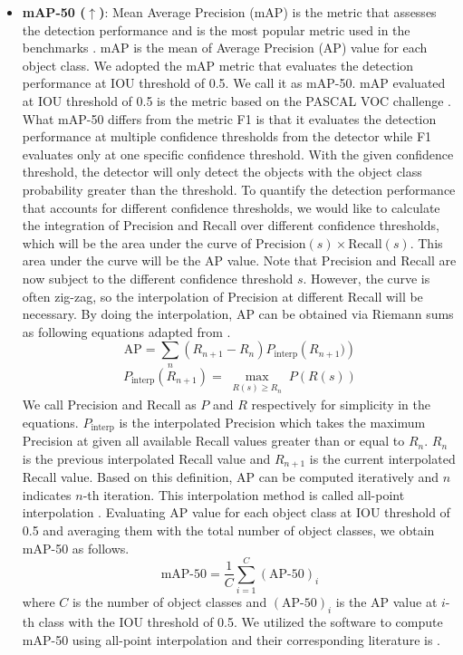 \begin{itemize}
\item \textbf{mAP-50 ($\uparrow$)}: Mean Average Precision (mAP) is the metric that assesses the detection performance and is the most popular metric used in the benchmarks \cite{padilla_comparative_2021}. mAP is the mean of Average Precision (AP) value for each object class. We adopted the mAP metric that evaluates the detection performance at IOU threshold of 0.5. We call it as mAP-50. mAP evaluated at IOU threshold of 0.5 is the metric based on the PASCAL VOC challenge \cite{everingham_pascal_2015}. What mAP-50 differs from the metric F1 is that it evaluates the detection performance at multiple confidence thresholds from the detector while F1 evaluates only at one specific confidence threshold. With the given confidence threshold, the detector will only detect the objects with the object class probability greater than the threshold. To quantify the detection performance that accounts for different confidence thresholds, we would like to calculate the integration of Precision and Recall over different confidence thresholds, which will be the area under the curve of $\text{Precision}(s) \times \text{Recall}(s)$. This area under the curve will be the AP value. Note that Precision and Recall are now subject to the different confidence threshold $s$. However, the curve is often zig-zag, so the interpolation of Precision at different Recall will be necessary. By doing the interpolation, AP can be obtained via Riemann sums as following equations adapted from \cite{padilla_survey_2020} \cite{padilla_comparative_2021}. 
\begin{equation}
\text{AP} = \sum_{n} \left( R_{n+1} - R_{n} \right) P_{\text{interp}} \left( R_{n+1}) \right)
\label{eqn:AP}
\end{equation}
\begin{equation}
P_{\text{interp}} \left( R_{n+1} \right) = \max_{\substack{R \left(s \right) \geq R_{n}}} P \left( R \left(s \right) \right)
\end{equation}
\label{eqn:P_interp}
We call Precision and Recall as $P$ and $R$ respectively for simplicity in the equations. $P_{\text{interp}}$ is the interpolated Precision which takes the maximum Precision at given all available Recall values greater than or equal to $R_{n}$. $R_{n}$ is the previous interpolated Recall value and $R_{n+1}$ is the current interpolated Recall value. Based on this definition, AP can be computed iteratively and $n$ indicates $n$-th iteration. This interpolation method is called all-point interpolation \cite{padilla_survey_2020}. Evaluating AP value for each object class at IOU threshold of 0.5 and averaging them with the total number of object classes, we obtain mAP-50 as follows.
\begin{equation}
\text{mAP-50} = \frac{1}{C} \sum_{i=1}^{C} \left( \text{AP-50} \right)_i
\label{eqn:mAP}
\end{equation}
where $C$ is the number of object classes and $\left( \text{AP-50} \right)_i$ is the AP value at $i$-th class with the IOU threshold of 0.5. We utilized the software \cite{cartucho_cartuchomap_2021} to compute mAP-50 using all-point interpolation and their corresponding literature is \cite{cartucho_robust_2018}.



\end{itemize}
